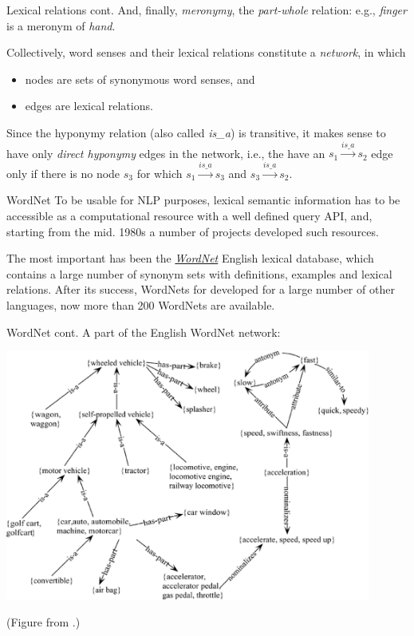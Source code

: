 \documentclass[style=upen, size=14pt]{powerdot}
\newcommand{\gold}{\color{arany}}
\theoremstyle{definition}
\begin{document}
\begin{slide}[toc=]{Lexical relations cont.}
  And, finally, \emph{\gold meronymy}, the \emph{part-whole} relation: e.g.,
  \emph{finger} is a meronym of \emph{hand}.\bigskip

  Collectively, word senses and their lexical relations constitute a \emph{\gold
    network}, in which
  \begin{itemize}
  \item nodes are sets of synonymous word senses, and
  \item edges are lexical relations. 
  \end{itemize}
  Since the hyponymy relation (also called \textit{is\_a}) is transitive, it
  makes sense to have only \emph{direct hyponymy} edges in the network, i.e.,
  the have an $s_1 \xrightarrow{is\_a} s_2$ edge only if there is no node $s_3$ for which
  $s_1 \xrightarrow{is\_a} s_3$ and $s_3 \xrightarrow{is\_a} s_2$.
\end{slide}

\begin{slide}[toc=WordNet]{WordNet}
  To be usable for NLP purposes, lexical semantic information has to be
  accessible as a computational resource with a well defined query API, and,
  starting from the mid. 1980s a number of projects developed such
  resources.\bigskip
  
  The most important has been the
  \href{https://wordnet.princeton.edu/}{\emph{WordNet}} English lexical
  database, which contains a large number of synonym sets with definitions,
  examples and lexical relations. After its success, WordNets for developed for
  a large number of other languages, now more than 200 WordNets are available.
\end{slide}

\begin{slide}[toc=]{WordNet cont.}
  A part of the English WordNet network:\medskip
  
  \begin{centering}
    
    \includegraphics[width=0.9\textwidth]{figures/wn.eps}


    \footnotesize{(Figure from \cite{navigli2009word}.)}
    
  \end{centering}
\end{slide}
\end{document}

